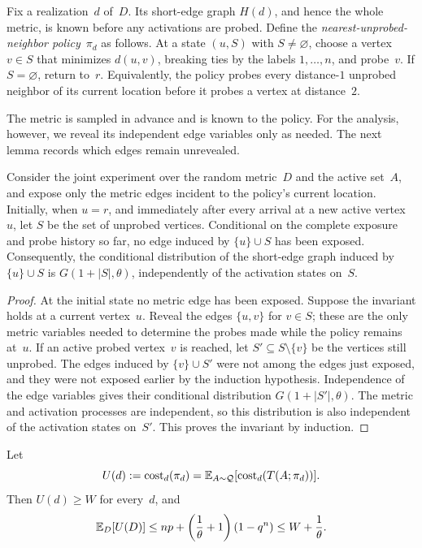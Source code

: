 \documentclass[12pt,a4paper,oneside]{report}
\begin{document}
Fix a realization~$d$ of~$D$.  Its short-edge
graph $H(d)$, and hence the whole metric, is known before any activations are
probed.  Define the \emph{nearest-unprobed-neighbor policy}~$\pi_d$ as follows.
At a state $(u,S)$ with $S\ne\varnothing$, choose a vertex~$v\in S$ that
minimizes $d(u,v)$, breaking ties by the labels $1,\ldots,n$, and probe~$v$.
If $S=\varnothing$, return to~$r$.  Equivalently, the policy probes every
distance-$1$ unprobed neighbor of its current location before it probes a
vertex at distance~$2$.

The metric is sampled in advance and is known to the policy.  For the
analysis, however, we reveal its independent edge variables only as needed.
The next lemma records which edges remain unrevealed.

\begin{lemma}\label{lem:random-metric-fresh-edges}
Consider the joint experiment over the random metric~$D$ and the active
set~$A$, and expose only the metric edges incident to the policy's current
location.  Initially, when $u=r$, and immediately after every arrival at a
new active vertex~$u$, let $S$ be the set of unprobed vertices.  Conditional
on the complete exposure and probe history so far, no edge induced by
$\{u\}\cup S$ has been exposed.  Consequently, the conditional distribution
of the short-edge graph induced by $\{u\}\cup S$ is
$G(1+|S|,\theta)$, independently of the activation states on~$S$.
\end{lemma}

\begin{proof}
At the initial state no metric edge has been exposed.  Suppose the invariant
holds at a current vertex~$u$.  Reveal the edges $\{u,v\}$ for $v\in S$;
these are the only metric variables needed to determine the probes made while
the policy remains at~$u$.  If an active probed vertex~$v$ is reached,
let $S'\subseteq S\setminus\{v\}$ be the vertices still unprobed.  The edges
induced by $\{v\}\cup S'$ were not among the edges just exposed, and they
were not exposed earlier by the induction hypothesis.  Independence of the
edge variables gives their conditional distribution $G(1+|S'|,\theta)$.  The metric
and activation processes are independent, so this distribution is also independent
of the activation states on~$S'$.  This proves the invariant by induction.
\end{proof}

\begin{lemma}
\label{lem:random-metric-adaptive-average}
Let
\[
    U(d):=\operatorname{cost}_d(\pi_d)
    =\mathbb{E}_{A\sim\mathcal Q}[\operatorname{cost}_d(T(A;\pi_d))].
\]
Then $U(d)\ge W$ for every~$d$, and
\[
    \mathbb{E}_D[U(D)]
    \le
    np+\left(\frac1\theta+1\right)(1-q^n)
    \le
    W+\frac1\theta.
\]
\end{lemma}
\end{document}

